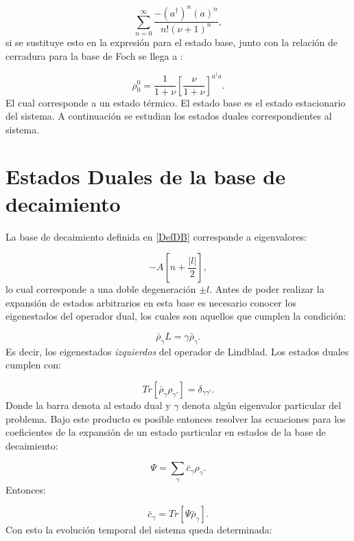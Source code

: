 \documentclass[a4paper,10pt]{report}
\begin{document}
\begin{equation}
\sum_{n=0}^\infty \frac{-(a^\dagger)^n (a)^n}{n!(\nu+1)^n},
\end{equation} si se sustituye esto en la expresión para el estado base, junto con la relación de cerradura para la base de Foch se llega a \cite{EnglertDB}:

\begin{equation}
\rho_0^0 = \frac{1}{1+\nu} [\frac{\nu}{1+\nu}]^{a^\dagger a}.
\end{equation}El cual corresponde a un estado térmico\cite{EnglertDB}. El estado base es el estado estacionario del sistema. A continuación se estudian los estados duales correspondientes al sistema.

\section{Estados Duales de la base de decaimiento}

La base de decaimiento \cite{EnglertDB} definida en \ref{DefDB} corresponde a eigenvalores:

\begin{equation}
 -A[n+\frac{|l|}{2}],
\end{equation}lo cual corresponde a una doble degeneración $\pm l$. Antes de poder realizar la expansión de estados arbitrarios en esta base es necesario conocer los eigenestados del operador dual, los cuales son aquellos que cumplen la condición\cite{EnglertDB}:

\begin{equation}
\bar{\rho}_\gamma L = \gamma\bar{\rho}_\gamma.
\end{equation} Es decir, los eigenestados \textit{izquierdos} del operador de Lindblad. Los estados duales cumplen con:

\begin{equation}
Tr[\bar{\rho}_{\gamma}\rho_{\gamma'}] = \delta_{\gamma\gamma'}.
\end{equation} Donde la barra denota al estado dual y $\gamma$ denota algún eigenvalor particular del problema. Bajo este producto es posible entonces resolver las ecuaciones para los coeficientes de la expansión de un estado particular en estados de la base de decaimiento:

\begin{equation}
\Psi = \sum_{\gamma}\bar{c}_\gamma \rho_\gamma.
\end{equation} Entonces:

\begin{equation}
\bar{c}_\gamma = Tr[\Psi\bar{\rho}_{\gamma}].
\end{equation} Con esto la evolución temporal del sistema queda determinada:
\end{document}
